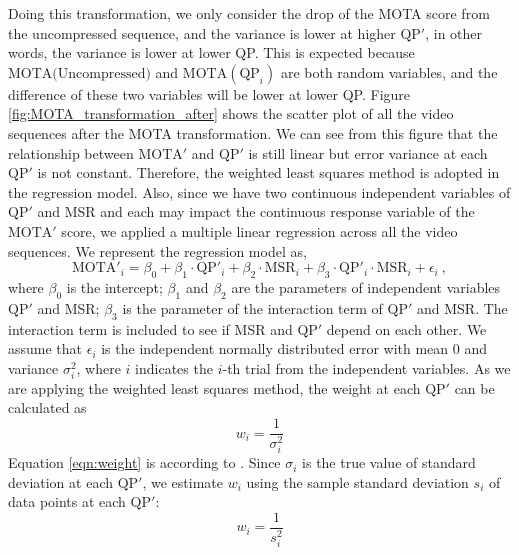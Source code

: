 Doing this transformation, we only consider the drop of the MOTA score from the uncompressed sequence, and the variance is lower at higher $\text{QP}'$, in other words, the variance is lower at lower QP. This is expected because $\text{MOTA(Uncompressed)}$ and $\text{MOTA}(\text{QP}_i)$ are both random variables, and the difference of these two variables will be lower at lower QP. Figure \ref{fig:MOTA_transformation_after} shows the scatter plot of all the video sequences after the MOTA transformation. We can see from this figure that the relationship between $\text{MOTA}'$ and $\text{QP}'$ is still linear but error variance at each $\text{QP}'$ is not constant. Therefore, the weighted least squares method is adopted in the regression model. Also, since we have two continuous independent variables of $\text{QP}'$ and MSR and each may impact the continuous response variable of the $\text{MOTA}'$ score, we applied a multiple linear regression across all the video sequences. We represent the regression model as,
\begin{equation}
\text{MOTA}'_i = \beta_0 + \beta_1 \cdot \text{QP}'_i + \beta_2 \cdot \text{MSR}_i + \beta_3 \cdot \text{QP}'_i \cdot \text{MSR}_i + \epsilon_i~,
\label{eqn:regression_model}
\end{equation}
where $\beta_0$ is the intercept; $\beta_1$ and $\beta_2$ are the parameters of independent variables $\text{QP}'$ and MSR; $\beta_3$ is the parameter of the interaction term of $\text{QP}'$ and MSR. The interaction term is included to see if MSR and $\text{QP}'$ depend on each other. We assume that $\epsilon_i$ is the independent normally distributed error with mean 0 and variance $\sigma^2_i$, where $i$ indicates the $i$-th trial from the independent variables. As we are applying the weighted least squares method, the weight at each $\text{QP}'$ can be calculated as
\begin{equation}
    w_i = \frac{1}{\sigma^2_i}
    \label{eqn:weight}
\end{equation}
Equation \eqref{eqn:weight} is according to \cite[p.~422]{kutner_applied_2005}. Since $\sigma_i$ is the true value of standard deviation at each $\text{QP}'$, we estimate $w_i$ using the sample standard deviation $s_i$ of data points at each $\text{QP}'$:
\begin{equation}
    w_i = \frac{1}{s^2_i}
    \label{eqn:estimated_weight}
\end{equation}


